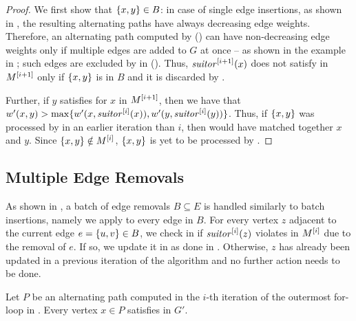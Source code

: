 \begin{proof}
We first show that $\set{x, y} \in B$: in case of single edge insertions,
as shown in , the resulting alternating paths
have always decreasing edge weights. Therefore, an alternating path computed
by \findaff () can have non-decreasing edge weights
only if multiple edges are added to $G$ at once -- as shown in the example
in ; such edges are excluded by \findaffb in
 ().
Thus, $\mathit{suitor}^{[i+1]}(x)$ does not satisfy  in $M^{[i + 1]}$
only if $\set{x, y}$ is in $B$ and it is discarded by \findaffb.

Further, if $y$ satisfies  for $x$ in $M^{[i + 1]}$, then we
have that $w'(x, y) > \max\{w'(x, \mathit{suitor}^{[i]}(x)), w'(y,
\mathit{suitor}^{[i]}(y))\}$. Thus, if $\set{x, y}$ was processed by
 in an earlier iteration than $i$, then
\findaffb would have matched together $x$ and $y$. Since $\set{x, y} \notin
M\iteri$, $\set{x, y}$ is yet to be processed by
.
\end{proof}

\subsection{Multiple Edge Removals}
\label{sec:dyn-mwm:multiple-removals}



As shown in , a batch of edge removals $B \subseteq E$
is handled similarly to batch insertions, namely we apply 
to every edge in $B$.
For every vertex $z$ adjacent to the current edge $e = \set{u, v} \in B$,
we check in  if $\mathit{suitor}^{[i]}(z)$ violates
 in $M^{[i]}$ due to the removal of $e$.
If so, we update it in
 as
done in . Otherwise, $z$ has already been
updated in a previous iteration of the algorithm and no further action needs to
be done.

\begin{proposition}
\label{prop:dyn-mwm:batch-rem}
Let $P$ be an alternating path computed in the $i$-th iteration of the
outermost for-loop in . Every vertex $x \in P$
satisfies  in $G'$.
\end{proposition}

